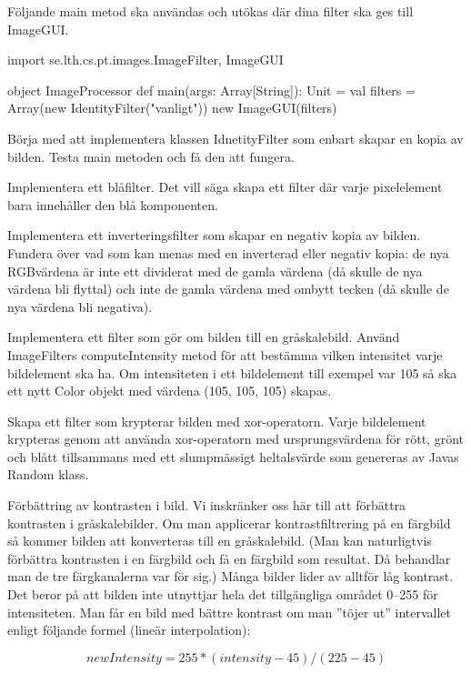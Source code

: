 Följande main metod ska användas och utökas där dina filter ska ges till ImageGUI.

\begin{Code}
import se.lth.cs.pt.images.{ImageFilter, ImageGUI}

object ImageProcessor {
  def main(args: Array[String]): Unit = {
    val filters = Array(new IdentityFilter("vanligt"))
    new ImageGUI(filters)
  }
}
\end{Code}

\Task Börja med att implementera klassen IdnetityFilter som enbart skapar en kopia av bilden. Testa main metoden och få den att fungera.

\Task Implementera ett blåfilter. Det vill säga skapa ett filter där varje pixelelement bara innehåller den blå komponenten.

\Task Implementera ett inverteringsfilter som skapar en negativ kopia av bilden. 
Fundera över vad som kan menas med en inverterad eller negativ kopia: de nya RGBvärdena är inte ett dividerat med de gamla värdena (då skulle de nya värdena bli flyttal) och inte de gamla värdena med ombytt tecken (då skulle de nya värdena bli negativa).


\Task Implementera ett filter som gör om bilden till en gråskalebild. Använd ImageFilters computeIntensity metod för att bestämma vilken intensitet varje bildelement ska ha. Om intensiteten i ett bildelement till exempel var 105 så ska ett nytt Color objekt med värdena (105, 105, 105) skapas.

\Task Skapa ett filter som krypterar bilden med xor-operatorn. Varje bildelement krypteras genom att använda xor-operatorn med ursprungsvärdena för rött, grönt och blått tillsammans med ett slumpmässigt heltalsvärde som genereras av Javas Random klass.

\Task Förbättring av kontrasten i bild. Vi inskränker oss här till att förbättra kontrasten i gråskalebilder. Om man applicerar kontrastfiltrering på en färgbild så kommer bilden att konverteras till en gråskalebild. (Man kan naturligtvis förbättra kontrasten i en färgbild och få en färgbild som resultat. Då behandlar man de tre färgkanalerna var för sig.) Många bilder lider av alltför låg kontrast. Det beror på att bilden inte utnyttjar hela det tillgängliga området 0–255 för intensiteten. Man får en bild med bättre kontrast om man ”töjer ut” intervallet enligt följande formel (lineär interpolation):

$$newIntensity = 255 * (intensity - 45) / (225 - 45)$$

